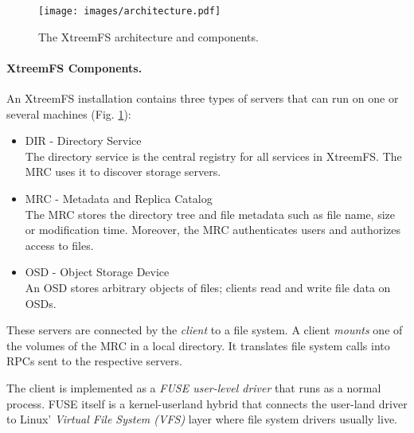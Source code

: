 \documentclass[a4paper,10pt]{book}
\begin{document}

\begin{figure}
 \centering
 \texttt{[image: images/architecture.pdf]}
 \caption{The XtreemFS architecture and components.}
 \label{fig:architecture}
\end{figure}


\paragraph{XtreemFS Components.}
An XtreemFS installation contains three types of servers that can run on one or several machines (Fig. \ref{fig:architecture}):

\begin{itemize}
 \item DIR - Directory Service\\
 The directory service is the central registry for all services in XtreemFS. The MRC uses it to discover storage servers.
 \item MRC - Metadata and Replica Catalog\\
 The MRC stores the directory tree and file metadata such as file name, size or modification time. Moreover, the MRC authenticates users and authorizes access to files.
 \item OSD - Object Storage Device\\
 An OSD stores arbitrary objects of files; clients read and write file data on OSDs.
\end{itemize}

These servers are connected by the \emph{client} to a file system. A client \emph{mounts} one of the volumes of the MRC in a local directory. It translates file system calls into RPCs sent to the respective servers.

The client is implemented as a \emph{FUSE user-level driver} that runs as a normal process. FUSE itself is a kernel-userland hybrid that connects the user-land driver to Linux' \emph{Virtual File System (VFS)} layer where file system drivers usually live.
\end{document}
